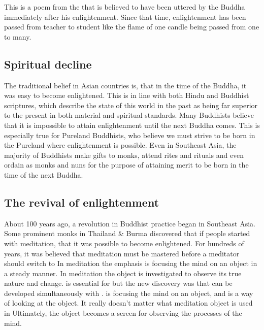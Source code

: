 \documentclass[a5paper,10pt,english]{book}
\begin{document}
\sphinxAtStartPar
This is a poem from the  that is believed to have been
uttered by the Buddha immediately after his enlightenment. Since that
time, enlightenment has been passed from teacher to student like the
flame of one candle being passed from one to many.


\subsection{Spiritual decline}
\label{\detokenize{saints:spiritual-decline}}
\sphinxAtStartPar
The traditional belief in Asian countries is, that in the time of the
Buddha, it was easy to become enlightened. This is in line with both
Hindu and Buddhist scriptures, which describe the state of this world in
the past as being far superior to the present in both material and
spiritual standards. Many Buddhists believe that it is impossible to
attain enlightenment until the next Buddha comes. This is especially
true for Pureland Buddhists, who believe we must strive to be born in
the Pureland where enlightenment is possible. Even in Southeast Asia,
the majority of Buddhists make gifts to monks, attend rites and rituals
and even ordain as monks and nuns for the purpose of attaining merit to
be born in the time of the next Buddha.


\subsection{The revival of enlightenment}
\label{\detokenize{saints:the-revival-of-enlightenment}}
\sphinxAtStartPar
About 100 years ago, a revolution in Buddhist practice began in
Southeast Asia. Some prominent monks in Thailand \& Burma discovered that
if people started with  meditation, that it was possible to
become enlightened. For hundreds of years, it was believed that 
meditation must be mastered before a meditator should switch to
 In  meditation the emphasis is focusing the
mind on an object in a steady manner. In  meditation the
object is investigated to observe its true nature and change. 
is essential for  but the new discovery was that
 can be developed simultaneously with .  is
focusing the mind on an object, and  is a way of looking
at the object. It really doesn’t matter what meditation object is used
in  Ultimately, the object becomes a screen for observing
the processes of the mind.
\end{document}
